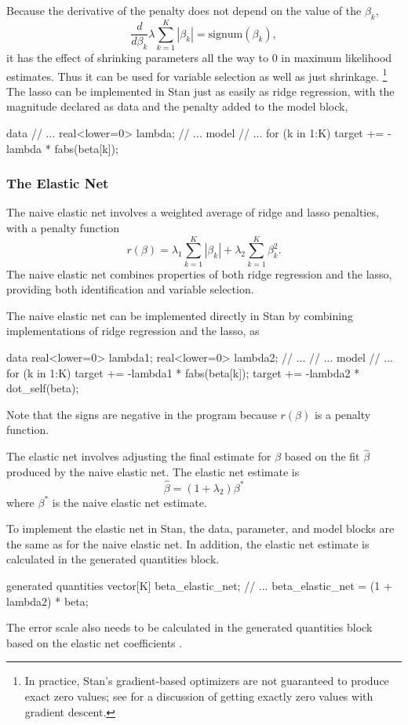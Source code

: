 Because the derivative of the penalty does not depend on the value of
the $\beta_k$,
\[
\frac{d}{d\beta_k} \lambda \sum_{k=1}^K | \beta_k | =
\mbox{signum}(\beta_k),
\]
it has the effect of shrinking parameters all the way to 0 in maximum
likelihood estimates.  Thus it can be used for variable selection as
well as just shrinkage.%
%
\footnote{In practice, Stan's gradient-based optimizers are not
  guaranteed to produce exact zero values; see
  \cite{LangfordEtAl:2009} for a discussion of getting exactly zero
  values with gradient descent.}
%
The lasso can be implemented in Stan just as easily as ridge
regression, with the magnitude declared as data and the penalty added
to the model block,
%
\begin{stancode}
data {
  // ...
  real<lower=0> lambda;
}
// ...
model {
  // ...
  for (k in 1:K)
    target += - lambda * fabs(beta[k]);
}
\end{stancode}

\subsubsection{The Elastic Net}

The naive elastic net \citep{ZouHastie:2005} involves a weighted
average of ridge and lasso penalties, with a penalty function
\[
r(\beta)
= \lambda_1 \sum_{k=1}^K |\beta_k|
+ \lambda_2 \sum_{k=1}^K \beta_k^2.
\]
The naive elastic net combines properties of both ridge regression and
the lasso, providing both identification and variable selection.

The naive elastic net can be implemented directly in Stan by combining
implementations of ridge regression and the lasso, as
%
\begin{stancode}
data {
  real<lower=0> lambda1;
  real<lower=0> lambda2;
  // ...
}
// ...
model {
  // ...
  for (k in 1:K)
    target += -lambda1 * fabs(beta[k]);
  target += -lambda2 * dot_self(beta);
}
\end{stancode}
%
Note that the signs are negative in the program because $r(\beta)$ is
a penalty function.

The elastic net \citep{ZouHastie:2005} involves adjusting the final estimate for
$\beta$ based on the fit $\hat{\beta}$ produced by the naive elastic
net.  The elastic net estimate is
\[
\hat{\beta} = (1 + \lambda_2) \beta^*
\]
where $\beta^{*}$ is the naive elastic net estimate.

To implement the elastic net in Stan, the data, parameter, and model
blocks are the same as for the naive elastic net.  In addition, the
elastic net estimate is calculated in the generated quantities block.
%
\begin{stancode}
generated quantities {
  vector[K] beta_elastic_net;
  // ...
  beta_elastic_net = (1 + lambda2) * beta;
}
\end{stancode}
%
The error scale also needs to be calculated in the generated
quantities block based on the elastic net coefficients
.


